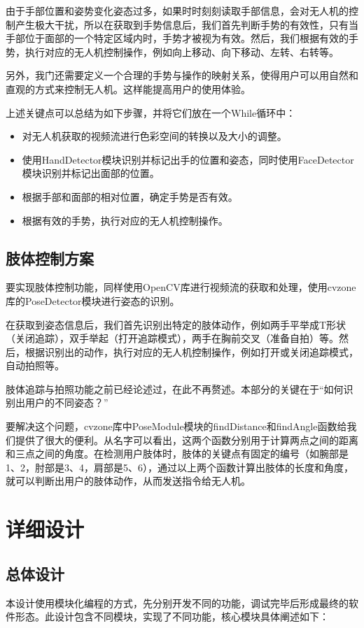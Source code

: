 \documentclass[report, twoside, UTF8, AutoFakeBold = 1, AutoFakeSlant, zihao = -4]{config}
\begin{document}
由于手部位置和姿势变化姿态过多，如果时时刻刻读取手部信息，会对无人机的控制产生极大干扰，所以在获取到手势信息后，我们首先判断手势的有效性，只有当手部位于面部的一个特定区域内时，手势才被视为有效。然后，我们根据有效的手势，执行对应的无人机控制操作，例如向上移动、向下移动、左转、右转等。

另外，我门还需要定义一个合理的手势与操作的映射关系，使得用户可以用自然和直观的方式来控制无人机。这样能提高用户的使用体验。

上述关键点可以总结为如下步骤，并将它们放在一个While循环中：
\begin{itemize}
    \item 对无人机获取的视频流进行色彩空间的转换以及大小的调整。
    \item 使用HandDetector模块识别并标记出手的位置和姿态，同时使用FaceDetector模块识别并标记出面部的位置。
    \item 根据手部和面部的相对位置，确定手势是否有效。
    \item 根据有效的手势，执行对应的无人机控制操作。
\end{itemize}

\section{肢体控制方案}
要实现肢体控制功能，同样使用OpenCV库进行视频流的获取和处理，使用cvzone库的PoseDetector模块进行姿态的识别。

在获取到姿态信息后，我们首先识别出特定的肢体动作，例如两手平举成T形状（关闭追踪），双手举起（打开追踪模式），两手在胸前交叉（准备自拍）等。然后，根据识别出的动作，执行对应的无人机控制操作，例如打开或关闭追踪模式，自动拍照等。

肢体追踪与拍照功能之前已经论述过，在此不再赘述。本部分的关键在于“如何识别出用户的不同姿态？”

要解决这个问题，cvzone库中PoseModule模块的findDistance和findAngle函数给我们提供了很大的便利。从名字可以看出，这两个函数分别用于计算两点之间的距离和三点之间的角度。在检测用户肢体时，肢体的关键点有固定的编号（如腕部是1、2，肘部是3、4，肩部是5、6），通过以上两个函数计算出肢体的长度和角度，就可以判断出用户的肢体动作，从而发送指令给无人机。


\chapter{详细设计}
\section{总体设计}
本设计使用模块化编程的方式，先分别开发不同的功能，调试完毕后形成最终的软件形态。此设计包含不同模块，实现了不同功能，核心模块具体阐述如下：
\end{document}
